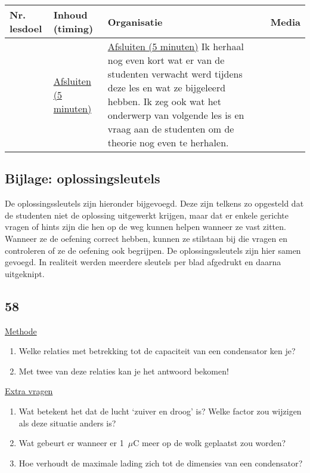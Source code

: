 \begin{landscape}
	


\begin{tabularx}{1.56\textwidth}{|p{1.5cm}|p{6cm}|X|p{4cm}|}
	\hline
	\textbf{Nr. lesdoel } & \textbf{Inhoud (timing)}  & \textbf{Organisatie } & \textbf{Media } \\ \hline
	&\underline{Afsluiten (5 minuten)}\newline 
	&  \underline{Afsluiten (5 minuten)}\newline
	Ik herhaal nog even kort wat er van de studenten verwacht werd tijdens deze les en wat ze bijgeleerd hebben. Ik zeg ook wat het onderwerp van volgende les is en vraag aan de studenten om de theorie nog even te herhalen.
	& 
	\\ \hline
\end{tabularx}
	
	
	
	
	
\end{landscape}

\subsection*{Bijlage: oplossingsleutels}
De oplossingssleutels zijn hieronder bijgevoegd. Deze zijn telkens zo opgesteld dat de studenten niet de oplossing uitgewerkt krijgen, maar dat er enkele gerichte vragen of hints zijn die hen op de weg kunnen helpen wanneer ze vast zitten. Wanneer ze de oefening correct hebben, kunnen ze stilstaan bij die vragen en controleren of ze de oefening ook begrijpen.\newline
De oplossingssleutels zijn hier samen gevoegd. In realiteit werden meerdere sleutels per blad afgedrukt en daarna uitgeknipt.

\subsection*{58}
\underline{Methode}
\begin{enumerate}
	\item Welke relaties met betrekking tot de capaciteit van een condensator ken je? 
	\item Met twee van deze relaties kan je het antwoord bekomen!
\end{enumerate}

\underline{Extra vragen}
\begin{enumerate}
	\item Wat betekent het dat de lucht `zuiver en droog' is? Welke factor zou wijzigen als deze situatie anders is?
	\item Wat gebeurt er wanneer er 1~$\mu$C meer op de wolk geplaatst zou worden?
	\item Hoe verhoudt de maximale lading zich tot de dimensies van een condensator?
\end{enumerate}






